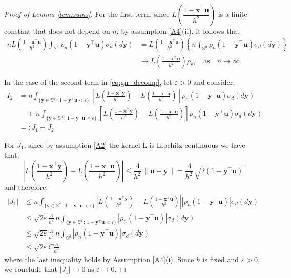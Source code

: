\documentclass[12pt]{report} %
\newcommand{\bx}{\mathbf{x}}
\newcommand{\by}{\mathbf{y}}
\newcommand{\bu}{\boldsymbol{u}}
\newcommand{\sigmad}{\sigma_{d}}
\newcommand{\Sd}{\mathbb{S}^{d}}
\begin{document}
\begin{proof}[Proof of Lemma \ref{lem:sums}]
For the first term, since $L\!\left(\dfrac{1 - \bx^\top \bu}{h^2}\right)$ is a finite constant 
that does not depend on $n$, by assumption \ref{A4}(ii), it follows that
\begin{align*}
n L\!\left(\frac{1 - \bx^\top \bu}{h^2}\right) \int_{\Sd} \rho_n\!\left(1 - \by^\top \bu\right) \sigmad(d\by) 
&= L\!\left(\frac{1 - \bx^\top \bu}{h^2}\right) \left\{ n \int_{\Sd} \rho_n\!\left(1 - \by^\top \bu\right) \sigmad(d\by) \right\} \nonumber \\
&\longrightarrow L\!\left(\frac{1 - \bx^\top \bu}{h^2}\right) \rho_c, \quad \text{as} \quad n \to \infty.
\end{align*}


In the case of the second term in \eqref{eq:gn_decomp}, let $\varepsilon > 0$ and consider:
\begin{align*}
I_2 & =  n \int_{\{\by \in \Sd \,:\, 1 - \by^\top \bu < \varepsilon\}} 
\left[ L\!\left(\frac{1 - \bx^\top \by}{h^2}\right) - L\!\left(\frac{1-\bx^\top\bu}{h^2}\right) \right] 
\rho_n\!\left(1 - \by^\top \bu\right) \sigmad(d\by) \nonumber \\
&\quad+ \, n \int_{\{\by \in \Sd \,:\, 1 - \by^\top \bu \geq \varepsilon\}} 
\left[ L\!\left(\frac{1 - \bx^\top \by}{h^2}\right) - L\!\left(\frac{1-\bx^\top\bu}{h^2}\right) \right] 
\rho_n\!\left(1 - \by^\top \bu\right) \sigmad(d\by) \nonumber \\ 
&=: J_1 + J_2
\end{align*}

For $J_1$, since by assumption \ref{A2} the kernel L is Lipchitz continuous we have that: 
\begin{equation*}
    \left|L\!\left(\frac{1 - \bx^\top \by}{h^2}\right) - L\!\left(\frac{1 - \bx^\top \bu}{h^2}\right)\right| \leq \frac{\Lambda}{h^2}\,\|\bu - \by\| = \frac{\Lambda}{h^2}\, \sqrt{2(1-\by^\top\bu)}
\end{equation*}
and therefore,
\begin{align*}
|J_1| & \leq  n \int_{\{\by \in \Sd \,:\, 1 - \by^\top \bu < \varepsilon\}} 
\left| L\!\left(\frac{1 - \bx^\top \by}{h^2}\right) - L\!\left(\frac{1-\bx^\top\bu}{h^2}\right) \right|
\left|\rho_n\!\left(1 - \by^\top \bu\right) \right|\sigmad(d\by) \nonumber \\
& \leq \sqrt{2\varepsilon} \frac{\Lambda}{h^2}\, n \int_{\{\by \in \Sd \,:\, 1 - \by^\top \bu < \varepsilon\}} \left|\rho_n\!\left(1 - \by^\top \bu\right) \right|\sigmad(d\by) \nonumber \\
& \leq \sqrt{2\varepsilon} \frac{\Lambda}{h^2} \, n \int_{\Sd} \left|\rho_n\!\left(1 - \by^\top \bu\right) \right|\sigmad(d\by) \nonumber
\nonumber \\
& \leq \sqrt{2\varepsilon} C\frac{\Lambda}{h^2} 
\end{align*}
where the last inequality holds by Assumption \ref{A4}(i). Since $h$ is fixed and $\varepsilon > 0$, we conclude that $|J_1| \to 0$ as $\varepsilon \to 0$.


\end{proof}
\end{document}
